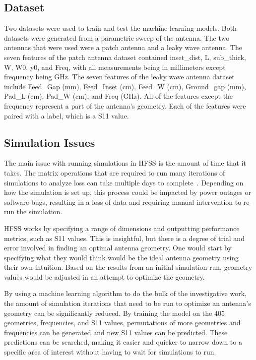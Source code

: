 \documentclass[lettersize,journal]{IEEEtran}
\begin{document}
\subsection{Dataset}
Two datasets were used to train and test the machine learning models. Both datasets were generated from a parametric sweep of the antenna. The two antennas that were used were a patch antenna and a leaky wave antenna. The seven features of the patch antenna dataset contained inset\_dist, L, sub\_thick, W, W0, y0, and Freq, with all measurements being in millimeters except frequency being GHz. The seven features of the leaky wave antenna dataset include Feed\_Gap (mm), Feed\_Inset (cm), Feed\_W (cm), Ground\_gap (mm), Pad\_L (cm), Pad\_W (cm), and Freq (GHz). All of the features except the frequency represent a part of the antenna's geometry. Each of the features were paired with a label, which is a S11 value. 


\subsection{Simulation Issues}
The main issue with running simulations in HFSS is the amount of time that it takes. The matrix operations that are required to run many iterations of simulations to analyze loss can take multiple days to complete~\cite{john_antenna_2009}. Depending on how the simulation is set up, this process could be impacted by power outages or software bugs, resulting in a loss of data and requiring manual intervention to re-run the simulation. 

HFSS works by specifying a range of dimensions and outputting performance metrics, such as S11 values. This is insightful, but there is a degree of trial and error involved in finding an optimal antenna geometry. One would start by specifying what they would think would be the ideal antenna geometry using their own intuition. Based on the results from an initial simulation run, geometry values would be adjusted in an attempt to optimize the geometry.

By using a machine learning algorithm to do the bulk of the investigative work, the amount of simulation iterations that need to be run to optimize an antenna's geometry can be significantly reduced. By training the model on the 405 geometries, frequencies, and S11 values, permutations of more geometries and frequencies can be generated and new S11 values can be predicted. These predictions can be searched, making it easier and quicker to narrow down to a specific area of interest without having to wait for simulations to run.
\end{document}
